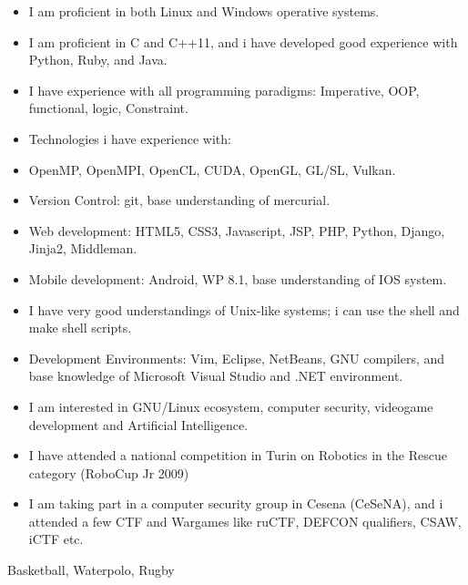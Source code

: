 \documentclass[helvetica,narrow,openbib,notitle,flagCMYK]{europecv}
\begin{document}
\begin{europecv}
	 {
		\begin{itemize}
			\item I am proficient in both Linux and Windows operative systems.
			\item I am proficient in C and C++11, and i have developed good experience with Python, Ruby, and Java.
			\item I have experience with all programming paradigms: Imperative, OOP, functional, logic, Constraint.
			\item Technologies i have experience with:
			\item OpenMP, OpenMPI, OpenCL, CUDA, OpenGL, GL/SL, Vulkan.
			\item Version Control: git, base understanding of mercurial.
			\item Web development: HTML5, CSS3, Javascript, JSP, PHP, Python, Django, Jinja2, Middleman.
			\item Mobile development: Android, WP 8.1, base understanding of IOS system.
			\item I have very good understandings of Unix-like systems; i can use the shell and make shell scripts.
			\item Development Environments: Vim, Eclipse, NetBeans, GNU compilers, and base knowledge of Microsoft Visual Studio and .NET environment.
		\end{itemize}
	}
	 {
		\begin{itemize}
			\item I am interested in GNU/Linux ecosystem, computer security, videogame development and Artificial Intelligence. 
			\item I have attended a national competition in Turin on Robotics in the Rescue category (RoboCup Jr 2009) 
			\item I am taking part in a computer security group in Cesena (CeSeNA), and i attended a few CTF and Wargames like ruCTF, DEFCON qualifiers, CSAW, iCTF etc.
		\end{itemize}
	}
	 {Basketball, Waterpolo, Rugby}


	\end{europecv}
\end{document}
